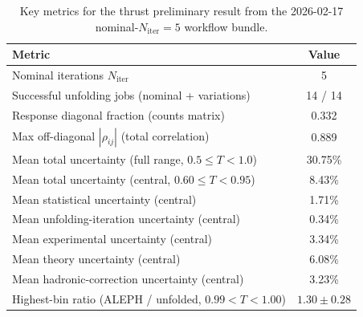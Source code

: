 \begin{table}[t!]
\centering
\begin{tabular}{l c}
\hline
Metric & Value \\
\hline
Nominal iterations $N_{\mathrm{iter}}$ & 5 \\
Successful unfolding jobs (nominal + variations) & 14 / 14 \\
Response diagonal fraction (counts matrix) & 0.332 \\
Max off-diagonal $|\rho_{ij}|$ (total correlation) & 0.889 \\
Mean total uncertainty (full range, $0.5\le T<1.0$) & 30.75\% \\
Mean total uncertainty (central, $0.60\le T<0.95$) & 8.43\% \\
Mean statistical uncertainty (central) & 1.71\% \\
Mean unfolding-iteration uncertainty (central) & 0.34\% \\
Mean experimental uncertainty (central) & 3.34\% \\
Mean theory uncertainty (central) & 6.08\% \\
Mean hadronic-correction uncertainty (central) & 3.23\% \\
Highest-bin ratio (ALEPH / unfolded, $0.99<T<1.00$) & $1.30 \pm 0.28$ \\
\hline
\end{tabular}
\caption{Key metrics for the thrust preliminary result from the 2026-02-17 nominal-$N_{\mathrm{iter}}=5$ workflow bundle.}
\label{tab:results_key_metrics}
\end{table}
